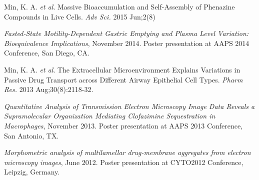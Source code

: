 \documentclass[10pt,twoside]{friggeri-cv}
\begin{document}
\begin{small}
Min, K. A. \emph{et al}. Massive Bioaccumulation and Self-Assembly of Phenazine Compounds in Live Cells. \emph{Adv Sci.} 2015 Jun;2(8)

\emph{Fasted-State Motility-Dependent Gastric Emptying and Plasma Level Variation: Bioequivalence Implications}, November 2014.
Poster presentation at AAPS 2014 Conference, San Diego, CA.

Min, K. A. \emph{et al}. The Extracellular Microenvironment Explains Variations in Passive Drug Transport across Different Airway Epithelial Cell Types. \emph{Pharm Res.} 2013 Aug;30(8):2118-32. 

\emph{Quantitative Analysis of Transmission Electron Microscopy Image Data Reveals a Supramolecular Organization Mediating Clofazimine Sequestration in Macrophages}, November 2013.
Poster presentation at AAPS 2013 Conference, San Antonio, TX.

\emph{Morphometric analysis of multilamellar drug-membrane aggregates from electron microscopy images}, June 2012. 
Poster presentation at CYTO2012 Conference, Leipzig, Germany.

\end{small}
\end{document}
